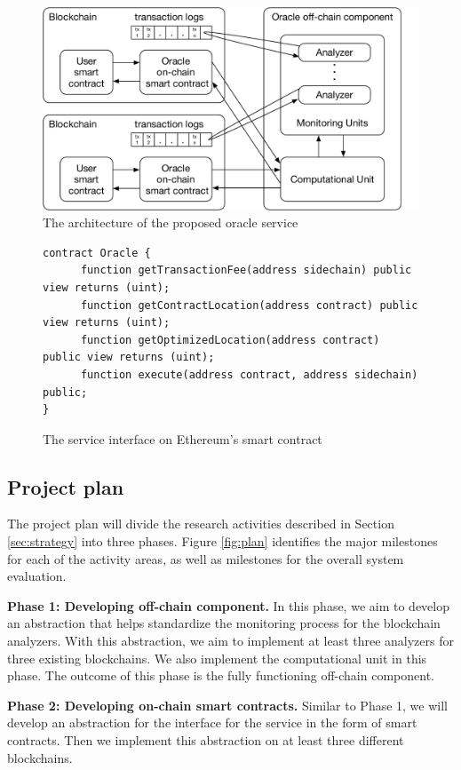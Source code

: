 \begin{figure}[ht!]
\begin{minipage}[b]{1\linewidth}
\centering
      \includegraphics[width=0.6\linewidth]{figures/architecture}
\end{minipage}
\caption{The architecture of the proposed oracle service}
\label{fig:architecture}
\end{figure}

\begin{figure}[ht!]
\begin{lstlisting}[language=Solidity,numbers=none]
contract Oracle {
      function getTransactionFee(address sidechain) public view returns (uint);
      function getContractLocation(address contract) public view returns (uint);
      function getOptimizedLocation(address contract) public view returns (uint);
      function execute(address contract, address sidechain) public;
}
\end{lstlisting}
\caption{The service interface on Ethereum's smart contract}
\label{fig:contract}
\end{figure}


\subsection{Project plan}

The project plan will divide the research activities described in Section
\ref{sec:strategy} into three phases. Figure \ref{fig:plan} identifies the major
milestones for each of the activity areas, as well as milestones for the overall
system evaluation.

\textbf{Phase 1: Developing off-chain component.} In this phase, we aim to develop
an abstraction that helps standardize the monitoring process for the blockchain
analyzers. With this abstraction, we aim to implement at least three analyzers
for three existing blockchains. We also implement the computational unit in
this phase. The outcome of this phase is the fully functioning off-chain
component.

\textbf{Phase 2: Developing on-chain smart contracts.} Similar to Phase 1, we
will develop an abstraction for the interface for the service in the form of smart
contracts. Then we implement this abstraction on at least three different
blockchains.

